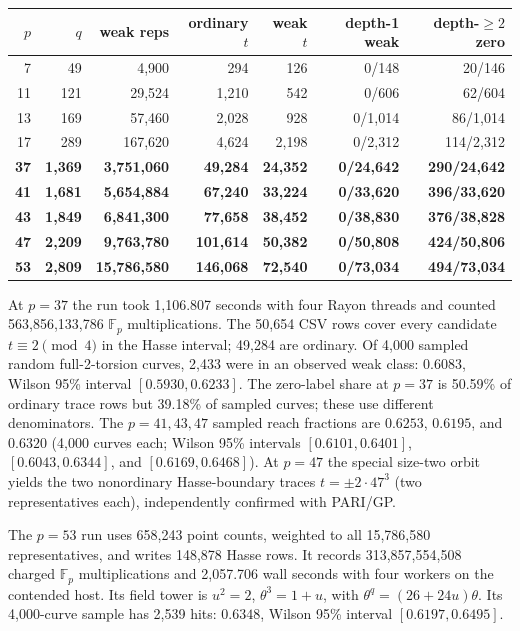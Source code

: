 \documentclass[10pt]{extarticle}
\begin{document}
\begin{center}
\begin{tabular}{@{}r r r r r r r@{}}
\toprule
$p$ & $q$ & weak reps & ordinary $t$ & weak $t$ & depth-1 weak & depth-$\geq2$ zero \\
\midrule
7 & 49 & 4,900 & 294 & 126 & 0/148 & 20/146 \\
11 & 121 & 29,524 & 1,210 & 542 & 0/606 & 62/604 \\
13 & 169 & 57,460 & 2,028 & 928 & 0/1,014 & 86/1,014 \\
17 & 289 & 167,620 & 4,624 & 2,198 & 0/2,312 & 114/2,312 \\
\textbf{37} & \textbf{1,369} & \textbf{3,751,060} & \textbf{49,284} & \textbf{24,352} & \textbf{0/24,642} & \textbf{290/24,642} \\
\textbf{41} & \textbf{1,681} & \textbf{5,654,884} & \textbf{67,240} & \textbf{33,224} & \textbf{0/33,620} & \textbf{396/33,620} \\
\textbf{43} & \textbf{1,849} & \textbf{6,841,300} & \textbf{77,658} & \textbf{38,452} & \textbf{0/38,830} & \textbf{376/38,828} \\
\textbf{47} & \textbf{2,209} & \textbf{9,763,780} & \textbf{101,614} & \textbf{50,382} & \textbf{0/50,808} & \textbf{424/50,806} \\
\textbf{53} & \textbf{2,809} & \textbf{15,786,580} & \textbf{146,068} & \textbf{72,540} & \textbf{0/73,034} & \textbf{494/73,034} \\
\bottomrule
\end{tabular}
\end{center}

\noindent At $p=37$ the run took 1,106.807 seconds with four Rayon
threads and counted 563,856,133,786 $\mathbb F_p$ multiplications.
The 50,654 CSV rows cover every candidate $t\equiv2\pmod4$ in the
Hasse interval; 49,284 are ordinary. Of 4,000 sampled random
full-2-torsion curves, 2,433 were in an observed weak class:
$0.6083$, Wilson 95\% interval $[0.5930,0.6233]$.
The zero-label share at $p=37$ is 50.59\% of ordinary trace rows but
39.18\% of sampled curves; these use different denominators. The
$p=41,43,47$ sampled reach fractions are $0.6253$, $0.6195$, and
$0.6320$ (4,000 curves each; Wilson 95\% intervals
$[0.6101,0.6401]$, $[0.6043,0.6344]$, and $[0.6169,0.6468]$).
At $p=47$ the special size-two orbit yields the two nonordinary
Hasse-boundary traces $t=\pm2\cdot47^3$ (two representatives each),
independently confirmed with PARI/GP.

\medskip
\noindent The $p=53$ run uses 658,243 point counts, weighted to all
15,786,580 representatives, and writes 148,878 Hasse rows. It records
313,857,554,508 charged $\mathbb F_p$ multiplications and 2,057.706 wall
seconds with four workers on the contended host. Its field tower is
$u^2=2$, $\theta^3=1+u$, with $\theta^q=(26+24u)\theta$.
Its 4,000-curve sample
has 2,539 hits: $0.6348$, Wilson 95\% interval $[0.6197,0.6495]$.
\end{document}
